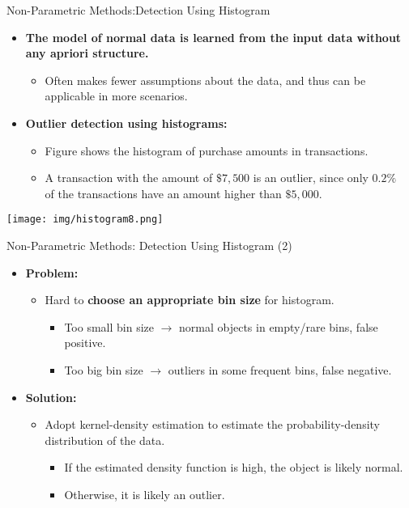 \begin{frame}{Non-Parametric Methods:Detection Using Histogram}
	\begin{itemize}
		\item \textbf{The model of normal data is learned from the input data without any apriori structure.}
		      \begin{itemize}
			      \item Often makes fewer assumptions about the data, and thus can be applicable in more scenarios.
		      \end{itemize}
		\item \textbf{Outlier detection using histograms:}
		      \begin{itemize}
			      \item Figure shows the histogram of purchase amounts in transactions.
			      \item A transaction with the amount of $\$7,500$ is an outlier, since only $0.2\%$ \\ of the transactions have an amount higher than $\$5,000$.
		      \end{itemize}
	\end{itemize}
	\centering
	\vspace{0.2cm}
	\texttt{[image: img/histogram8.png]}
\end{frame}


\begin{frame}{Non-Parametric Methods: Detection Using Histogram (2)}
	\begin{itemize}
		\item \textbf{Problem:}
		      \begin{itemize}
			      \item Hard to \textbf{\color{airforceblue}choose an appropriate bin size} for histogram.
			            \begin{itemize}
				            \item Too small bin size $\rightarrow$ normal objects in empty/rare bins, false positive.
				            \item Too big bin size $\rightarrow$ outliers in some frequent bins, false negative.
			            \end{itemize}
		      \end{itemize}
		\item \textbf{Solution:}
		      \begin{itemize}
			      \item Adopt kernel-density estimation to estimate the probability-density distribution of the data.
			            \begin{itemize}
				            \item If the estimated density function is high, the object is likely normal.
				            \item Otherwise, it is likely an outlier.
			            \end{itemize}
		      \end{itemize}
	\end{itemize}
\end{frame}
